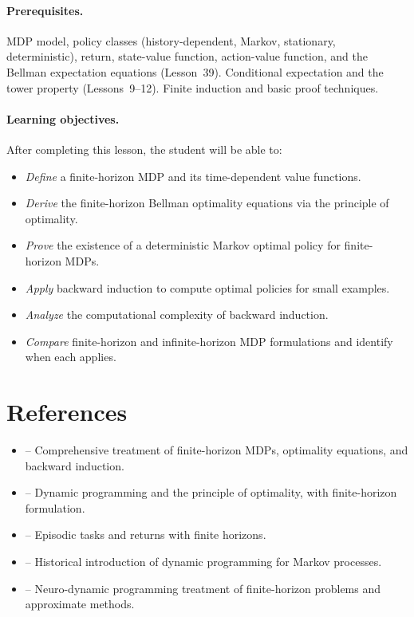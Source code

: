 \documentclass[11pt,a4paper]{article}
\begin{document}
\paragraph{Prerequisites.}
MDP model, policy classes (history-dependent, Markov, stationary,
deterministic), return, state-value function, action-value function,
and the Bellman expectation equations (Lesson~39). Conditional
expectation and the tower property (Lessons~9--12). Finite induction
and basic proof techniques.

\paragraph{Learning objectives.}
After completing this lesson, the student will be able to:
\begin{itemize}
    \item \emph{Define} a finite-horizon MDP and its time-dependent
    value functions.
    \item \emph{Derive} the finite-horizon Bellman optimality
    equations via the principle of optimality.
    \item \emph{Prove} the existence of a deterministic Markov
    optimal policy for finite-horizon MDPs.
    \item \emph{Apply} backward induction to compute optimal policies
    for small examples.
    \item \emph{Analyze} the computational complexity of backward
    induction.
    \item \emph{Compare} finite-horizon and infinite-horizon MDP
    formulations and identify when each applies.
\end{itemize}


\section{References}
\label{sec:references}

\begin{itemize}
    \item \citet[Chapter 4]{puterman2014} -- Comprehensive treatment
    of finite-horizon MDPs, optimality equations, and backward
    induction.
    \item \citet[Chapter 1, Sections 1.2--1.3]{bertsekas2012} --
    Dynamic programming and the principle of optimality, with
    finite-horizon formulation.
    \item \citet[Chapter 3]{suttonbarto2018} -- Episodic tasks and
    returns with finite horizons.
    \item \citet{howard1960} -- Historical introduction of dynamic
    programming for Markov processes.
    \item \citet{bertsekas1996} -- Neuro-dynamic programming treatment
    of finite-horizon problems and approximate methods.
\end{itemize}
\end{document}
